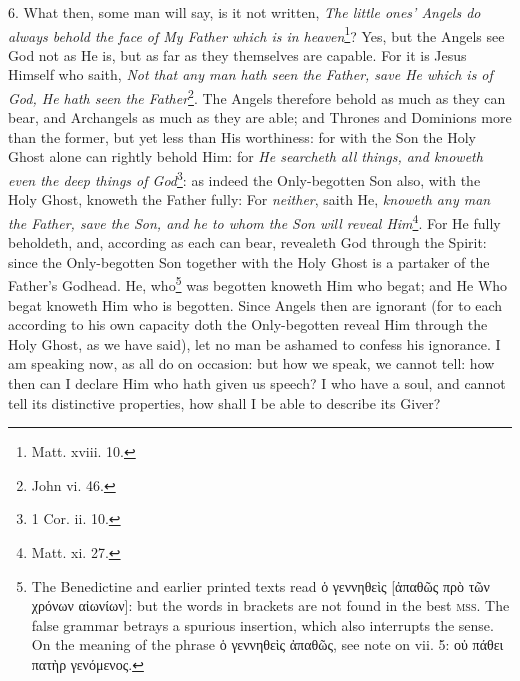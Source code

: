 6. What then, some man will say, is it not written, \emph{The little ones’ Angels do always behold the face of My Father which is in heaven}\footnote{Matt. xviii. 10.}? Yes, but the Angels see God not as He is, but as far as they themselves are capable. For it is Jesus Himself who saith, \emph{Not that any man hath seen the Father, save He which is of God, He hath seen the Father}\footnote{John vi. 46.}. The Angels therefore behold as much as they can bear, and Archangels as much as they are able; and Thrones and Dominions more than the former, but yet less than His worthiness: for with the Son the Holy Ghost alone can rightly behold Him: for \emph{He searcheth all things, and knoweth even the deep things of God}\footnote{1 Cor. ii. 10.}: as indeed the Only-begotten Son also, with the Holy Ghost, knoweth the Father fully: For \emph{neither}, saith He, \emph{knoweth any man the Father, save the Son, and he to whom the Son will reveal Him}\footnote{Matt. xi. 27.}. For He fully beholdeth, and, according as each can bear, revealeth God through the Spirit: since the Only-begotten Son together with the Holy Ghost is a partaker of the Father’s Godhead. He, who\footnote{The Benedictine and earlier printed texts read \textgreek{ὁ γεννηθεὶς [ἀπαθῶς πρὸ τῶν χρόνων αἰωνίων]}: but the words in brackets are not found in the best \textsc{mss.} The false grammar betrays a spurious insertion, which also interrupts the sense. On the meaning of the phrase \textgreek{ὁ γεννηθεὶς ἀπαθῶς}, see note on vii. 5: \textgreek{οὐ πάθει πατὴρ γενόμενος}.} was begotten knoweth Him who begat; and He Who begat knoweth Him who is begotten. Since Angels then are ignorant (for to each according to his own capacity doth the Only-begotten reveal Him through the Holy Ghost, as we have said), let no man be ashamed to confess his ignorance. I am speaking now, as all do on occasion: but how we speak, we cannot tell: how then can I declare Him who hath given us speech? I who have a soul, and cannot tell its distinctive properties, how shall I be able to describe its Giver?

